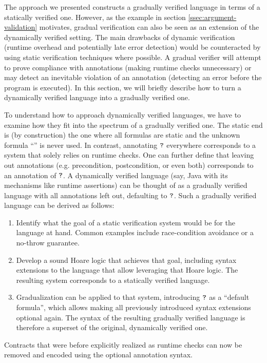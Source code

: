 The approach we presented constructs a gradually verified language in terms of a statically verified one.
However, as the example in section \ref{ssec:argument-validation} motivates, gradual verification can also be seen as an extension of the dynamically verified setting.
The main drawbacks of dynamic verification (runtime overhead and potentially late error detection) would be counteracted by using static verification techniques where possible.
A gradual verifier will attempt to prove compliance with annotations (making runtime checks unnecessary) or may detect an inevitable violation of an annotation (detecting an error before the program is executed).
In this section, we will briefly describe how to turn a dynamically verified language into a gradually verified one.

To understand how to approach dynamically verified languages, we have to examine how they fit into the spectrum of a gradually verified one.
The static end is (by construction) the one where all formulas are static and the unknown formula “\qm” is never used.
In contrast, annotating $\textup{\texttt{?}}$ everywhere corresponds to a system that solely relies on runtime checks.
One can further define that leaving out annotations (e.g. precondition, postcondition, or even both) corresponds to an annotation of $\textup{\texttt{?}}$.
A dynamically verified language (say, Java with its mechanisms like runtime assertions) can be thought of as a gradually verified language with all annotations left out, defaulting to $\textup{\texttt{?}}$.
Such a gradually verified language can be derived as follows:

\begin{enumerate}
    \item 
    Identify what the goal of a static verification system would be for the language at hand.
    Common examples include race-condition avoidance or a no-throw guarantee.
    
    \item
    Develop a sound Hoare logic that achieves that goal, including syntax extensions to the language that allow leveraging that Hoare logic.
    The resulting system corresponds to a statically verified language.
    
    \item
    Gradualization can be applied to that system, introducing $\textup{\texttt{?}}$ as a “default formula”, which allows making all previously introduced syntax extensions optional again.
    The syntax of the resulting gradually verified language is therefore a superset of the original, dynamically verified one.
\end{enumerate}

Contracts that were before explicitly realized as runtime checks can now be removed and encoded using the optional annotation syntax.
